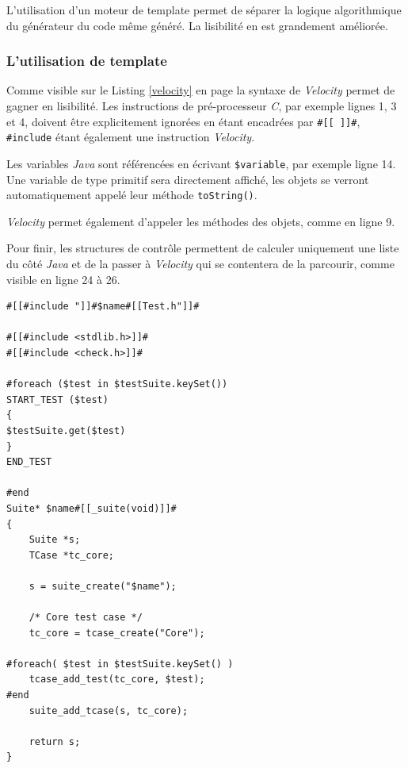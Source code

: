 L'utilisation d'un moteur de template permet de séparer la logique algorithmique du générateur du code même généré. La lisibilité en est grandement améliorée.

\subsubsection{L'utilisation de template}

Comme visible sur le Listing \ref{velocity} en page \pageref{velocity} la syntaxe de \emph{Velocity} permet de gagner en lisibilité. Les instructions de pré-processeur \emph{C}, par exemple lignes 1, 3 et 4, doivent être explicitement ignorées en étant encadrées par \texttt{\#[[ ]]\#}, \texttt{\#include} étant également une instruction \emph{Velocity}.

Les variables \emph{Java} sont référencées en écrivant \texttt{\$variable}, par exemple ligne 14. Une variable de type primitif sera directement affiché, les objets se verront automatiquement appelé leur méthode \texttt{toString()}.

\emph{Velocity} permet également d'appeler les méthodes des objets, comme en ligne 9.

Pour finir, les structures de contrôle permettent de calculer uniquement une liste du côté \emph{Java} et de la passer à \emph{Velocity} qui se contentera de la parcourir, comme visible en ligne 24 à 26.


\begin{lstlisting}[frame=single, label={velocity}]
#[[#include "]]#$name#[[Test.h"]]#

#[[#include <stdlib.h>]]#
#[[#include <check.h>]]#

#foreach ($test in $testSuite.keySet())
START_TEST ($test)
{
$testSuite.get($test)
}
END_TEST

#end
Suite* $name#[[_suite(void)]]#
{
	Suite *s;
	TCase *tc_core;

	s = suite_create("$name");

	/* Core test case */
	tc_core = tcase_create("Core");

#foreach( $test in $testSuite.keySet() )
	tcase_add_test(tc_core, $test);
#end
	suite_add_tcase(s, tc_core);

	return s;
}
\end{lstlisting}

